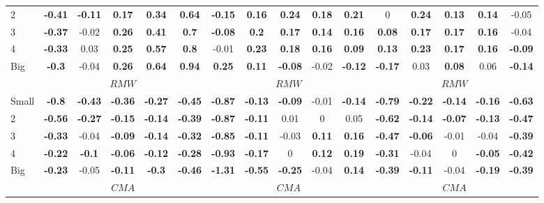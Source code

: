 \begin{table}[H]
\begin{tabular}{lccccc|ccccc|ccccc}
2 & \textbf{-0.41} & \textbf{-0.11} & \textbf{0.17} & \textbf{0.34} & \textbf{0.64} & \textbf{-0.15} & \textbf{0.16} & \textbf{0.24} & \textbf{0.18} & \textbf{0.21} & 0 & \textbf{0.24} & \textbf{0.13} & \textbf{0.14} & -0.05 \\
3 & \textbf{-0.37} & -0.02 & \textbf{0.26} & \textbf{0.41} & \textbf{0.7} & \textbf{-0.08} & \textbf{0.2} & \textbf{0.17} & \textbf{0.14} & \textbf{0.16} & \textbf{0.08} & \textbf{0.17} & \textbf{0.17} & \textbf{0.16} & -0.04 \\
4 & \textbf{-0.33} & 0.03 & \textbf{0.25} & \textbf{0.57} & \textbf{0.8} & -0.01 & \textbf{0.23} & \textbf{0.18} & \textbf{0.16} & \textbf{0.09} & \textbf{0.13} & \textbf{0.23} & \textbf{0.17} & \textbf{0.16} & \textbf{-0.09} \\
Big & \textbf{-0.3} & -0.04 & \textbf{0.26} & \textbf{0.64} & \textbf{0.94} & \textbf{0.25} & \textbf{0.11} & \textbf{-0.08} & -0.02 & \textbf{-0.12} & \textbf{-0.17} & 0.03 & \textbf{0.08} & 0.06 & \textbf{-0.14} \\
 & \multicolumn{5}{c|}{$RMW$} & \multicolumn{5}{c|}{$RMW$} & \multicolumn{5}{c}{$RMW$} \\
Small & \textbf{-0.8} & \textbf{-0.43} & \textbf{-0.36} & \textbf{-0.27} & \textbf{-0.45} & \textbf{-0.87} & \textbf{-0.13} & \textbf{-0.09} & -0.01 & \textbf{-0.14} & \textbf{-0.79} & \textbf{-0.22} & \textbf{-0.14} & \textbf{-0.16} & \textbf{-0.63} \\
2 & \textbf{-0.56} & \textbf{-0.27} & \textbf{-0.15} & \textbf{-0.14} & \textbf{-0.39} & \textbf{-0.87} & \textbf{-0.11} & 0.01 & 0 & 0.05 & \textbf{-0.62} & \textbf{-0.14} & \textbf{-0.07} & \textbf{-0.13} & \textbf{-0.47} \\
3 & \textbf{-0.33} & -0.04 & \textbf{-0.09} & \textbf{-0.14} & \textbf{-0.32} & \textbf{-0.85} & \textbf{-0.11} & -0.03 & \textbf{0.11} & \textbf{0.16} & \textbf{-0.47} & \textbf{-0.06} & -0.01 & -0.04 & \textbf{-0.39} \\
4 & \textbf{-0.22} & \textbf{-0.1} & \textbf{-0.06} & \textbf{-0.12} & \textbf{-0.28} & \textbf{-0.93} & \textbf{-0.17} & 0 & \textbf{0.12} & \textbf{0.19} & \textbf{-0.31} & -0.04 & 0 & \textbf{-0.05} & \textbf{-0.42} \\
Big & \textbf{-0.23} & -0.05 & \textbf{-0.11} & \textbf{-0.3} & \textbf{-0.46} & \textbf{-1.31} & \textbf{-0.55} & \textbf{-0.25} & -0.04 & \textbf{0.14} & \textbf{-0.39} & \textbf{-0.11} & -0.04 & \textbf{-0.19} & \textbf{-0.39} \\
 & \multicolumn{5}{c|}{$CMA$} & \multicolumn{5}{c|}{$CMA$} & \multicolumn{5}{c}{$CMA$} \\

\end{tabular}
\end{table}
